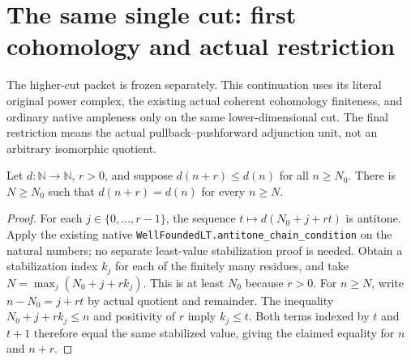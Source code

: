 \section{The same single cut: first cohomology and actual restriction}
The higher-cut packet is frozen separately. This continuation uses its literal
original power complex, the existing actual coherent cohomology finiteness,
and ordinary native ampleness only on the same lower-dimensional cut.
The final restriction means the actual pullback--pushforward adjunction unit,
not an arbitrary isomorphic quotient.

\begin{lemma}
\label{lem:seshadri-fixed-step-dimension-stabilization}
Let $d:\mathbb N\to\mathbb N$, $r>0$, and suppose
$d(n+r)\leq d(n)$ for all $n\geq N_0$. There is $N\geq N_0$ such that
$d(n+r)=d(n)$ for every $n\geq N$.
\end{lemma}
\begin{proof}
For each $j\in\{0,\ldots,r-1\}$, the sequence
$t\mapsto d(N_0+j+rt)$ is antitone. Apply the existing native
\texttt{WellFoundedLT.antitone\_chain\_condition} on the natural numbers;
no separate least-value stabilization proof is needed. Obtain a stabilization
index $k_j$ for each of the finitely many residues, and take
$N=\max_j(N_0+j+rk_j)$. This is at least $N_0$ because $r>0$.
For $n\geq N$, write $n-N_0=j+rt$ by actual quotient and remainder.
The inequality $N_0+j+rk_j\leq n$ and positivity of $r$ imply $k_j\leq t$.
Both terms indexed by $t$ and $t+1$ therefore equal the same stabilized
value, giving the claimed equality for $n$ and $n+r$.
\end{proof}

